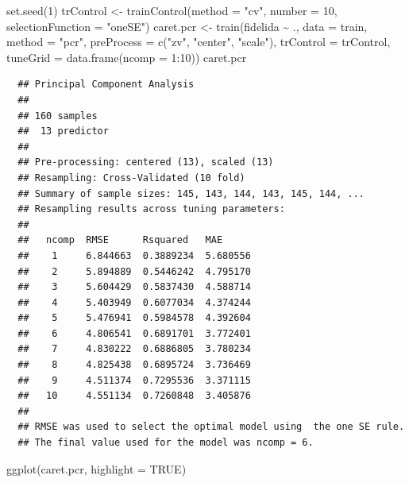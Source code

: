 \documentclass[
]{book}
\newenvironment{Shaded}{\begin{snugshade}}{\end{snugshade}}
\newcommand{\AttributeTok}[1]{\textcolor[rgb]{0.77,0.63,0.00}{#1}}
\newcommand{\ConstantTok}[1]{\textcolor[rgb]{0.00,0.00,0.00}{#1}}
\newcommand{\DecValTok}[1]{\textcolor[rgb]{0.00,0.00,0.81}{#1}}
\newcommand{\FunctionTok}[1]{\textcolor[rgb]{0.00,0.00,0.00}{#1}}
\newcommand{\NormalTok}[1]{#1}
\newcommand{\OtherTok}[1]{\textcolor[rgb]{0.56,0.35,0.01}{#1}}
\newcommand{\SpecialCharTok}[1]{\textcolor[rgb]{0.00,0.00,0.00}{#1}}
\newcommand{\StringTok}[1]{\textcolor[rgb]{0.31,0.60,0.02}{#1}}
\theoremstyle{break}
\theoremstyle{nonumberplain}
\begin{document}
\begin{Shaded}
\begin{Highlighting}[]
\FunctionTok{set.seed}\NormalTok{(}\DecValTok{1}\NormalTok{)}
\NormalTok{trControl }\OtherTok{\textless{}{-}} \FunctionTok{trainControl}\NormalTok{(}\AttributeTok{method =} \StringTok{"cv"}\NormalTok{, }\AttributeTok{number =} \DecValTok{10}\NormalTok{, }\AttributeTok{selectionFunction =} \StringTok{"oneSE"}\NormalTok{)}
\NormalTok{caret.pcr }\OtherTok{\textless{}{-}} \FunctionTok{train}\NormalTok{(fidelida }\SpecialCharTok{\textasciitilde{}}\NormalTok{ ., }\AttributeTok{data =}\NormalTok{ train, }\AttributeTok{method =} \StringTok{"pcr"}\NormalTok{,}
                   \AttributeTok{preProcess =} \FunctionTok{c}\NormalTok{(}\StringTok{"zv"}\NormalTok{, }\StringTok{"center"}\NormalTok{, }\StringTok{"scale"}\NormalTok{),}
                   \AttributeTok{trControl =}\NormalTok{ trControl, }\AttributeTok{tuneGrid =} \FunctionTok{data.frame}\NormalTok{(}\AttributeTok{ncomp =} \DecValTok{1}\SpecialCharTok{:}\DecValTok{10}\NormalTok{))}
\NormalTok{caret.pcr}
\end{Highlighting}
\end{Shaded}

\begin{verbatim}
  ## Principal Component Analysis 
  ## 
  ## 160 samples
  ##  13 predictor
  ## 
  ## Pre-processing: centered (13), scaled (13) 
  ## Resampling: Cross-Validated (10 fold) 
  ## Summary of sample sizes: 145, 143, 144, 143, 145, 144, ... 
  ## Resampling results across tuning parameters:
  ## 
  ##   ncomp  RMSE      Rsquared   MAE     
  ##    1     6.844663  0.3889234  5.680556
  ##    2     5.894889  0.5446242  4.795170
  ##    3     5.604429  0.5837430  4.588714
  ##    4     5.403949  0.6077034  4.374244
  ##    5     5.476941  0.5984578  4.392604
  ##    6     4.806541  0.6891701  3.772401
  ##    7     4.830222  0.6886805  3.780234
  ##    8     4.825438  0.6895724  3.736469
  ##    9     4.511374  0.7295536  3.371115
  ##   10     4.551134  0.7260848  3.405876
  ## 
  ## RMSE was used to select the optimal model using  the one SE rule.
  ## The final value used for the model was ncomp = 6.
\end{verbatim}

\begin{Shaded}
\begin{Highlighting}[]
\FunctionTok{ggplot}\NormalTok{(caret.pcr, }\AttributeTok{highlight =} \ConstantTok{TRUE}\NormalTok{)}
\end{Highlighting}
\end{Shaded}
\end{document}
